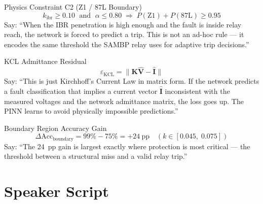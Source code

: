 \documentclass[12pt,a4paper]{article}
\newcommand{\kibr}{k_\mathrm{ibr}}
\begin{document}
\begin{formulabox}{Physics Constraint C2 (Z1 / 87L Boundary)}
\[
  \kibr \geq 0.10 \;\text{ and }\; \alpha \leq 0.80
  \;\Longrightarrow\;
  P(\text{Z1}) + P(\text{87L}) \geq 0.95
\]
Say: ``When the IBR penetration is high enough and the fault is inside relay reach, the network is forced to predict a trip. This is not an ad-hoc rule — it encodes the same threshold the SAMBP relay uses for adaptive trip decisions.''
\end{formulabox}

\begin{formulabox}{KCL Admittance Residual}
\[
  \varepsilon_\mathrm{KCL} = \|\mathbf{K}\hat{\mathbf{V}} - \hat{\mathbf{I}}\|
\]
Say: ``This is just Kirchhoff's Current Law in matrix form. If the network predicts a fault classification that implies a current vector $\hat{\mathbf{I}}$ inconsistent with the measured voltages and the network admittance matrix, the loss goes up. The PINN learns to avoid physically impossible predictions.''
\end{formulabox}

\begin{formulabox}{Boundary Region Accuracy Gain}
\[
  \Delta \text{Acc}_\text{boundary} = 99\% - 75\% = +24~\text{pp}
  \quad (k \in [0.045,\; 0.075])
\]
Say: ``The 24~pp gain is largest exactly where protection is most critical — the threshold between a structural miss and a valid relay trip.''
\end{formulabox}

\section{Speaker Script}
\end{document}
